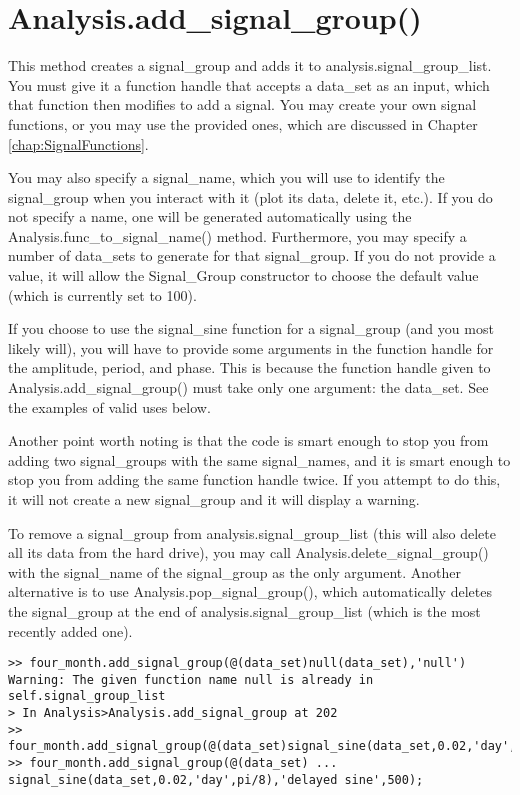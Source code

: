 \documentclass[12pt]{report}
\begin{document}
\section{Analysis.add\_signal\_group()}
This method creates a signal\_group and adds it to analysis.signal\_group\_list.  You must give it a function handle that accepts a data\_set as an input, which that function then modifies to add a signal.  You may create your own signal functions, or you may use the provided ones, which are discussed in Chapter \ref{chap:SignalFunctions}.

You may also specify a signal\_name, which you will use to identify the signal\_group when you interact with it (plot its data, delete it, etc.).  If you do not specify a name, one will be generated automatically using the Analysis.func\_to\_signal\_name() method.  Furthermore, you may specify a number of data\_sets to generate for that signal\_group.  If you do not provide a value, it will allow the Signal\_Group constructor to choose the default value (which is currently set to 100).

If you choose to use the signal\_sine function for a signal\_group (and you most likely will), you will have to provide some arguments in the function handle for the amplitude, period, and phase.  This is because the function handle given to Analysis.add\_signal\_group() must take only one argument: the data\_set.  See the examples of valid uses below.

Another point worth noting is that the code is smart enough to stop you from adding two signal\_groups with the same signal\_names, and it is smart enough to stop you from adding the same function handle twice.  If you attempt to do this, it will not create a new signal\_group and it will display a warning.

To remove a signal\_group from analysis.signal\_group\_list (this will also delete all its data from the hard drive), you may call Analysis.delete\_signal\_group() with the signal\_name of the signal\_group as the only argument.  Another alternative is to use Analysis.pop\_signal\_group(), which automatically deletes the signal\_group at the end of analysis.signal\_group\_list (which is the most recently added one).

\begin{verbatim}
>> four_month.add_signal_group(@(data_set)null(data_set),'null')
Warning: The given function name null is already in self.signal_group_list 
> In Analysis>Analysis.add_signal_group at 202 
>> four_month.add_signal_group(@(data_set)signal_sine(data_set,0.02,'day',0));
>> four_month.add_signal_group(@(data_set) ...
signal_sine(data_set,0.02,'day',pi/8),'delayed sine',500);
\end{verbatim}
\end{document}

